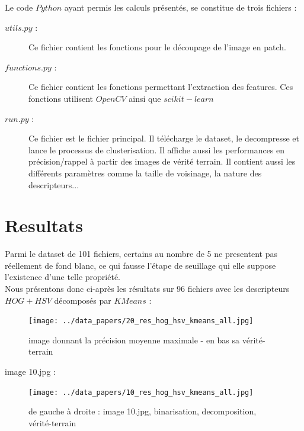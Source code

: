 \documentclass{book}
\begin{document}
Le code $Python$ ayant permis les calculs présentés, se constitue de trois fichiers :
\begin{description} %

\item[$utils.py$ :] Ce fichier contient les fonctions pour le découpage de l'image en patch.
\item[$functions.py$ :] Ce fichier contient les fonctions permettant l'extraction des features. Ces fonctions utilisent $OpenCV$ \cite{opencv_library} ainsi que $scikit-learn$ \cite{scikit-learn}
\item[$run.py$ :] Ce fichier est le fichier principal. Il télécharge le dataset, le decompresse et lance le processus de clusterisation. Il affiche aussi les performances
en précision/rappel à partir des images de vérité terrain. Il contient aussi les différents paramètres comme la taille de voisinage, la nature des descripteurs...

\end{description}


\chapter{Resultats}

Parmi le dataset de 101 fichiers, certains au nombre de 5 ne presentent pas réellement de fond blanc, ce qui fausse l'étape de seuillage qui elle suppose l'existence d'une telle
propriété.\\
Nous présentons donc ci-après les résultats sur 96 fichiers avec les descripteurs $HOG+HSV$ décomposés par $KMeans$ :\\

\begin{figure}[H]
\begin{center}
\texttt{[image: ../data\_papers/20\_res\_hog\_hsv\_kmeans\_all.jpg]}
\end{center}
\caption{image donnant la précision moyenne maximale - en bas sa vérité-terrain}
\label{meilleur_precision}
\end{figure}


image 10.jpg : 
\begin{figure}[H]
\begin{center}
\texttt{[image: ../data\_papers/10\_res\_hog\_hsv\_kmeans\_all.jpg]}
\end{center}
\caption{de gauche à droite : image 10.jpg, binarisation, decomposition, vérité-terrain}
\label{10}
\end{figure}
\clearpage
\end{document}
